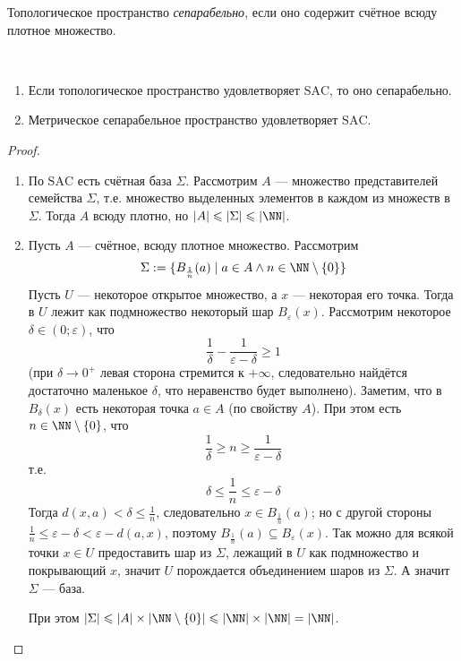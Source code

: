 \documentclass[12pt,a4paper]{article}
\newcommand{\SAC}{\ensuremath{\mathrm{SAC}}\xspace}
\begin{document}
    \begin{definition}
        Топологическое пространство \emph{сепарабельно}, если оно содержит счётное всюду плотное множество.
    \end{definition}

    \begin{theorem}\ 
        \begin{enumerate}
            \item Если топологическое пространство удовлетворяет \SAC, то оно сепарабельно.
            \item Метрическое сепарабельное пространство удовлетворяет \SAC.
        \end{enumerate}
    \end{theorem}

    \begin{proof}\ 
        \begin{enumerate}
            \item По \SAC есть счётная база $\Sigma$. Рассмотрим $A$ --- множество представителей семейства $\Sigma$, т.е. множество выделенных элементов в каждом из множеств в $\Sigma$. Тогда $A$ всюду плотно, но $|A| \leqslant |\Sigma| \leqslant |\NN|$.

            \item Пусть $A$ --- счётное, всюду плотное множество. Рассмотрим
                \[\Sigma := \{B_{\frac{1}{n}}(a) \mid a \in A \wedge n \in \NN \setminus \{0\}\}\]
                Пусть $U$ --- некоторое открытое множество, а $x$ --- некоторая его точка. Тогда в $U$ лежит как подмножество некоторый шар $B_\varepsilon(x)$. Рассмотрим некоторое $\delta \in (0; \varepsilon)$, что
                \[\frac{1}{\delta} - \frac{1}{\varepsilon - \delta} \geqslant 1\]
                (при $\delta \to 0^+$ левая сторона стремится к $+\infty$, следовательно найдётся достаточно маленькое $\delta$, что неравенство будет выполнено). Заметим, что в $B_\delta(x)$ есть некоторая точка $a \in A$ (по свойству $A$). При этом есть $n \in \NN \setminus \{0\}$, что
                \[\frac{1}{\delta} \geqslant n \geqslant \frac{1}{\varepsilon - \delta}\]
                т.е.
                \[\delta \leqslant \frac{1}{n} \leqslant \varepsilon - \delta\]
                Тогда $d(x, a) < \delta \leqslant \frac{1}{n}$, следовательно $x \in B_{\frac{1}{n}}(a)$; но с другой стороны $\frac{1}{n} \leqslant \varepsilon - \delta < \varepsilon - d(a, x)$, поэтому $B_\frac{1}{n}(a) \subseteq B_\varepsilon(x)$. Так можно для всякой точки $x \in U$ предоставить шар из $\Sigma$, лежащий в $U$ как подмножество и покрывающий $x$, значит $U$ порождается объединением шаров из $\Sigma$. А значит $\Sigma$ --- база.

                При этом $|\Sigma| \leqslant |A| \times |\NN \setminus \{0\}| \leqslant |\NN| \times |\NN| = |\NN|$.
        \end{enumerate}
    \end{proof}
\end{document}
